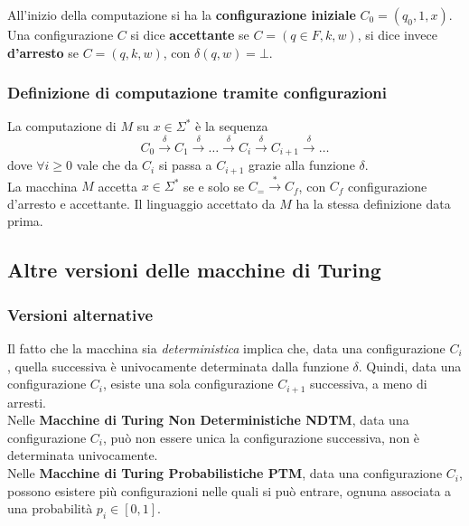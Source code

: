All'inizio della computazione si ha la \textbf{configurazione iniziale} $C_0 = (q_0, 1, x)$.\\

Una configurazione $C$ si dice \textbf{accettante} se $C = (q \in F, k, w)$, si dice invece \textbf{d'arresto} se $C = (q, k, w)$, con $\delta (q,w) = \bot$.\\

\subsubsection{Definizione di computazione tramite configurazioni}

La computazione di $M$ su $x \in \Sigma^\ast$ è la sequenza
$$ C_0 \xrightarrow{\delta} C_1 \xrightarrow{\delta} \dots \xrightarrow{\delta} C_i \xrightarrow{\delta} C_{i+1} \xrightarrow{\delta} \dots $$
dove $\forall i \geq 0$ vale che da $C_i$ si passa a $C_{i+1}$ grazie alla funzione $\delta$.\\

La macchina $M$ accetta $x \in \Sigma^\ast$ se e solo se $C_= \xrightarrow{\ast}C_f$, con $C_f$ configurazione d'arresto e accettante. Il linguaggio accettato da $M$ ha la stessa definizione data prima.\\

\subsection{Altre versioni delle macchine di Turing}
\subsubsection{Versioni alternative}

Il fatto che la macchina sia \textit{deterministica} implica che, data una configurazione $C_i$, quella successiva è univocamente determinata dalla funzione $\delta$. Quindi, data una configurazione $C_i$, esiste una sola configurazione $C_{i+1}$ successiva, a meno di arresti.\\

Nelle \textbf{Macchine di Turing Non Deterministiche NDTM}, data una configurazione $C_i$, può non essere unica la configurazione successiva, non è determinata univocamente.\\

Nelle \textbf{Macchine di Turing Probabilistiche PTM}, data una configurazione $C_i$, possono esistere più configurazioni nelle quali si può entrare, ognuna associata a una probabilità $p_i \in [0,1]$.\\

